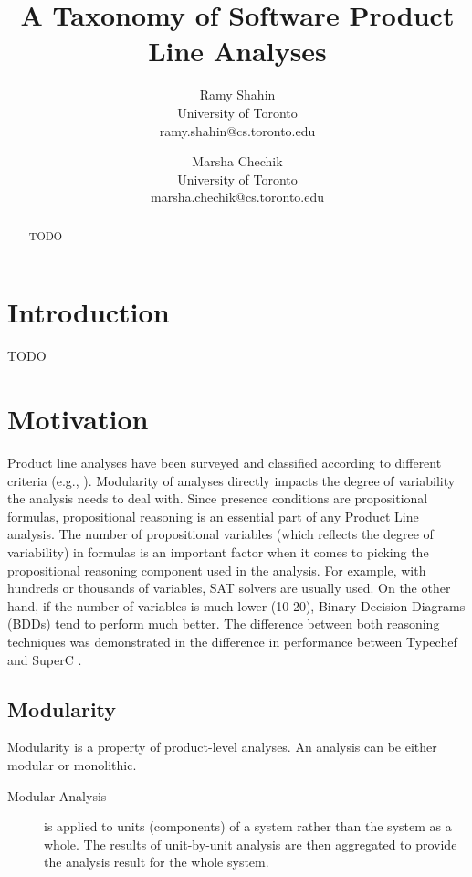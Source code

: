 \documentclass[11pt, english]{article}
\begin{document}
\title{A Taxonomy of Software Product Line Analyses}

\author{Ramy Shahin \\
  University of Toronto \\
 ramy.shahin@cs.toronto.edu
 \and
  Marsha Chechik \\
  University of Toronto \\
 marsha.chechik@cs.toronto.edu}

\maketitle

\begin{abstract}
TODO
\end{abstract}

\section{Introduction}
TODO

\section{Motivation}
Product line analyses have been surveyed and classified according to different criteria (e.g., \cite{Thum:2014}). 
Modularity of analyses directly impacts the degree of variability the analysis needs to deal with. Since presence conditions are propositional formulas, propositional reasoning is an essential part of any Product Line analysis. The number of propositional variables (which reflects the degree of variability) in formulas is an important factor when it comes to picking the propositional reasoning component used in the analysis. For example, with hundreds or thousands of variables, SAT solvers are usually used. On the other hand, if the number of variables is much lower (10-20), Binary Decision Diagrams (BDDs) tend to perform much better. The difference between both reasoning techniques was demonstrated in the difference in performance between Typechef \cite{Kastner:2011} and SuperC \cite{Gazzillo:2012}.

\subsection{Modularity}

Modularity is a property of product-level analyses. An analysis can be either modular or monolithic. 
\begin{description}
\item [Modular Analysis]
is applied to units (components) of a system rather than the system as a whole. The results of unit-by-unit analysis are then aggregated to provide the analysis result for the whole system.
\end{description}
\end{document}
